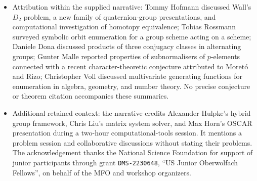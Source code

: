 \documentclass[11pt]{article}
\begin{document}
\begin{itemize}
\item Attribution within the supplied narrative: Tommy Hofmann discussed Wall's \(D_2\) problem, a new family of quaternion-group presentations, and computational investigation of homotopy equivalence; Tobias Rossmann surveyed symbolic orbit enumeration for a group scheme acting on a scheme; Daniele Dona discussed products of three conjugacy classes in alternating groups; Gunter Malle reported properties of subnormalisers of \(p\)-elements connected with a recent character-theoretic conjecture attributed to Moretó and Rizo; Christopher Voll discussed multivariate generating functions for enumeration in algebra, geometry, and number theory. No precise conjecture or theorem citation accompanies these summaries.
\item Additional retained context: the narrative credits Alexander Hulpke's hybrid group framework, Chris Liu's matrix system solver, and Max Horn's OSCAR presentation during a two-hour computational-tools session. It mentions a problem session and collaborative discussions without stating their problems. The acknowledgement thanks the National Science Foundation for support of junior participants through grant \texttt{DMS-2230648}, ``US Junior Oberwolfach Fellows'', on behalf of the MFO and workshop organizers.
\end{itemize}
\end{document}
